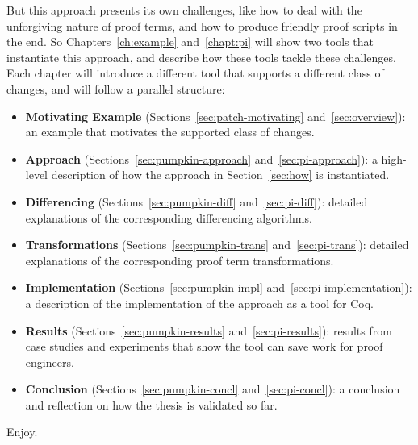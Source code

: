 But this approach presents its own challenges,
like how to deal with the unforgiving nature of proof terms,
and how to produce friendly proof scripts in the end.
So Chapters~\ref{ch:example} and~\ref{chapt:pi} will show two tools that instantiate this approach,
and describe how these tools tackle these challenges.
Each chapter will introduce a different tool that supports a different class of changes,
and will follow a parallel structure:

\begin{itemize}
\item \textbf{Motivating Example} (Sections~\ref{sec:patch-motivating} and~\ref{sec:overview}):
an example that motivates the supported class of changes. 
\item \textbf{Approach} (Sections~\ref{sec:pumpkin-approach} and~\ref{sec:pi-approach}):
a high-level description of how the approach in Section~\ref{sec:how} is instantiated.
\item \textbf{Differencing} (Sections~\ref{sec:pumpkin-diff} and~\ref{sec:pi-diff}):
detailed explanations of the corresponding differencing algorithms.
\item \textbf{Transformations} (Sections~\ref{sec:pumpkin-trans} and~\ref{sec:pi-trans}):
detailed explanations of the corresponding proof term transformations.
\item \textbf{Implementation} (Sections~\ref{sec:pumpkin-impl} and~\ref{sec:pi-implementation}):
a description of the implementation of the approach as a tool for Coq.
\item \textbf{Results} (Sections~\ref{sec:pumpkin-results} and~\ref{sec:pi-results}):
results from case studies and experiments that show the tool can save work for proof engineers.
\item \textbf{Conclusion} (Sections~\ref{sec:pumpkin-concl} and~\ref{sec:pi-concl}):
a conclusion and reflection on how the thesis is validated so far.
\end{itemize}
Enjoy.

